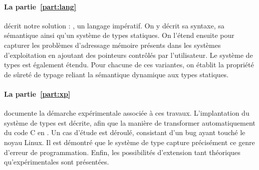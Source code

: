 
\paragraph{La partie~\ref{part:lang}} décrit notre solution : \langname, un
langage impératif. On y décrit sa syntaxe, sa sémantique ainsi qu'un système de
types statiques. On l'étend ensuite pour capturer les problèmes d'adressage
mémoire présents dans les systèmes d'exploitation en ajoutant des pointeurs
contrôlés par l'utilisateur. Le système de types est également étendu. Pour
chacune de ces variantes, on établit la propriété de sûreté de typage reliant la
sémantique dynamique aux types statiques.


\paragraph{La partie~\ref{part:xp}} documente la démarche expérimentale associée
à ces travaux. L'implantation du système de types est décrite, afin que la
manière de transformer automatiquement du code C en \langname. Un cas d'étude
est déroulé, consistant d'un bug ayant touché le noyau Linux. Il est démontré
que le système de type capture précisément ce genre d'erreur de programmation.
Enfin, les possibilités d'extension tant théoriques qu'expérimentales sont
présentées.




